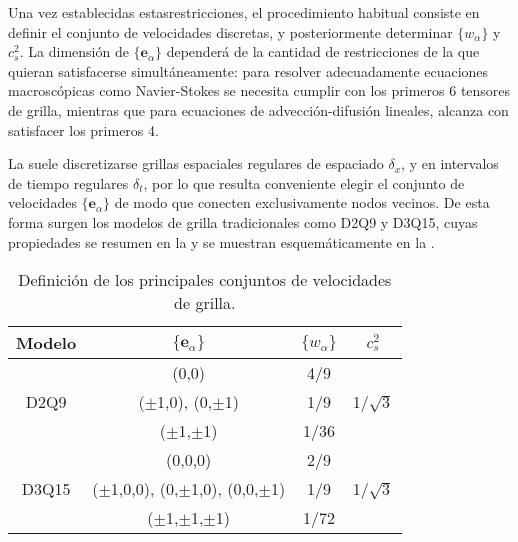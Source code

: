 Una vez establecidas estasrestricciones, el procedimiento habitual consiste en definir el conjunto de velocidades discretas, y posteriormente determinar $\{w_{\alpha}\}$ y $c_s^2$. La dimensi\'on de $\{ \bm{e}_{\alpha}\}$ depender\'a de la cantidad de restricciones de la  que quieran satisfacerse simult\'aneamente: para resolver adecuadamente ecuaciones macrosc\'opicas como Navier-Stokes se necesita cumplir con los primeros 6 tensores de grilla, mientras que para ecuaciones de advecci\'on-difusi\'on lineales, alcanza con satisfacer los primeros 4.
\par
La  suele discretizarse grillas espaciales regulares de espaciado $\delta_x$, y en intervalos de tiempo regulares $\delta_t$, por lo que resulta conveniente elegir el conjunto de velocidades $\{ \bm{e}_{\alpha} \}$ de modo que conecten exclusivamente nodos vecinos. De esta forma surgen los modelos de grilla tradicionales como D2Q9 y D3Q15, cuyas propiedades se resumen en la  y se muestran esquem\'aticamente en la .

\begin{table}[ht]
	\centering
    \begin{tabular}{c c c c}
	    \toprule
        \bf Modelo & $\{\bm{e}_{\alpha}\}$ & $\{w_{\alpha}\}$ & $c_s^2$ \\
        \midrule
        \midrule
        \multirow{3}{*}{D2Q9} & (0,0) & 4/9 & \multirow{3}{*}{1/$\sqrt{3}$} \\
                              & ($\pm$1,0), (0,$\pm$1) & 1/9 &  \\
                              & ($\pm$1,$\pm$1) & 1/36 &  \\                              
        \midrule
        \multirow{3}{*}{D3Q15} & (0,0,0) & 2/9 & \multirow{3}{*}{1/$\sqrt{3}$} \\
                               & ($\pm$1,0,0), (0,$\pm$1,0), (0,0,$\pm$1) & 1/9 &  \\
                               & ($\pm$1,$\pm$1,$\pm$1) & 1/72 &  \\         
        \bottomrule
	\end{tabular}
	\caption{Definici\'on de los principales conjuntos de velocidades de grilla.}
	\label{tab:DdQq}
\end{table}  

